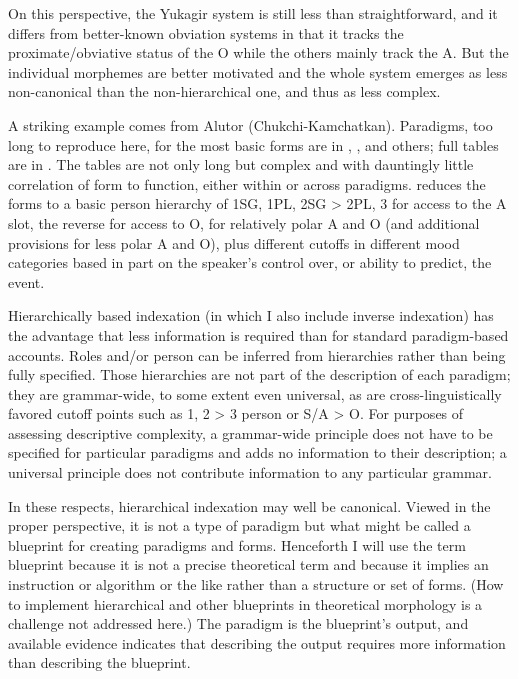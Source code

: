 \documentclass[output=collectionpaper]{langsci/langscibook}
\begin{document}
On this perspective, the Yukagir system is still less than straightforward, and it differs from better-known obviation systems in that it tracks the proximate/obvia\-tive status of the O while the others mainly track the A. But the individual morphemes are better motivated and the whole system emerges as less non-canonical than the non-hierarchical one, and thus as less complex.

A striking example comes from Alutor (Chukchi-Kamchatkan). Paradigms, too long to reproduce here, for the most basic forms are in \citet{Nagayam2003}, \citet{Malcev1998}, and others; full tables are in \citet[639--648]{Kibrik2004}. The tables are not only long but complex and with dauntingly little correlation of form to function, either within or across paradigms. \citet{Kibrik2003} reduces the forms to a basic person hierarchy of 1SG, 1PL, 2SG > 2PL, 3 for access to the A slot, the reverse for access to O, for relatively polar A and O (and additional provisions for less polar A and O), plus different cutoffs in different mood categories based in part on the speaker's control over, or ability to predict, the event.

Hierarchically based indexation (in which I also include inverse indexation) has the advantage that less information is required than for standard paradigm-based accounts. Roles and/or person can be inferred from hierarchies rather than being fully specified. Those hierarchies are not part of the description of each paradigm; they are grammar-wide, to some extent even universal, as are cross-linguistically favored cutoff points such as 1, 2 > 3 person or S/A > O. For purposes of assessing descriptive complexity, a grammar-wide principle does not have to be specified for particular paradigms and adds no information to their description; a universal principle does not contribute information to any particular grammar.

In these respects, hierarchical indexation may well be canonical. Viewed in the proper perspective, it is not a type of paradigm but what might be called a blueprint for creating paradigms and forms. Henceforth I will use the term blueprint because it is not a precise theoretical term and because it implies an instruction or algorithm or the like rather than a structure or set of forms. (How to implement hierarchical and other blueprints in theoretical morphology is a challenge not addressed here.) The paradigm is the blueprint's output, and available evidence indicates that describing the output requires more information than describing the blueprint.
\end{document}
